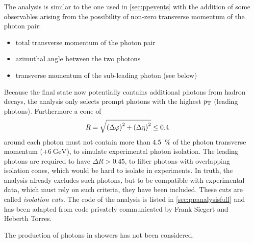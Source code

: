 The analysis is similar to the one used in \cref{sec:ppevents} with
the addition of some observables arising from the possibility of
non-zero transverse momentum of the photon pair:
%
\begin{itemize}
\item total transverse momentum of the photon pair
\item azimuthal angle between the two photons
\item transverse momentum of the sub-leading photon (see below)
\end{itemize}
%
Because the final state now potentially contains additional photons
from hadron decays, the analysis only selects prompt photons with the
highest \(p_\mathrm{T}\) (leading photons). Furthermore a cone of
\[R = \sqrt{\qty(\Delta\varphi)^2 + \qty(\Delta\eta)^2} \leq 0.4\]
around each photon must not contain more than \SI{4.5}{\percent} of
the photon transverse momentum (\(+ \SI{6}{\giga\electronvolt}\)), to
simulate experimental photon isolation. The leading photons are
required to have \(\Delta R > 0.45\), to filter photons with
overlapping isolation cones, which would be hard to isolate in
experiments. In truth, the analysis already excludes such photons,
but to be compatible with experimental data, which must rely on such
criteria, they have been included. These cuts are called
\emph{isolation cuts}. The code of the analysis is listed in
\cref{sec:ppanalysisfull} and has been adapted from code privately
communicated by Frank Siegert and Heberth Torres.

The production of photons in showers has not been considered.


